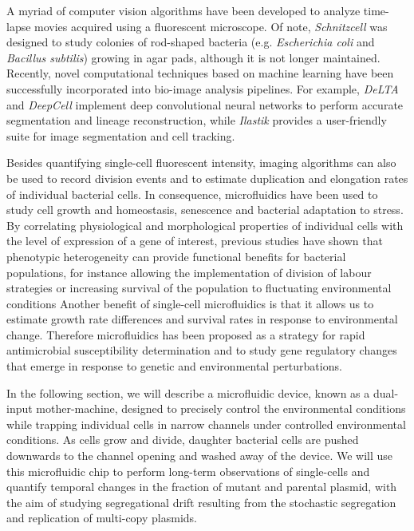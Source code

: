 \documentclass[fleqn,12pt]{wlscirep}
\begin{document}
A myriad of computer vision algorithms have been developed to analyze time-lapse movies acquired using a fluorescent microscope\cite{Young2012,vanValen2016,Berg2019,balomenos2017image,arnoldini2014bistable,sachs2016image,lugagne2019delta,kamentsky2011improved}.  Of note, {\em Schnitzcell}\cite{Young2012} was designed to study colonies of rod-shaped bacteria (e.g. {\em Escherichia coli} and {\em Bacillus subtilis}) growing in agar pads, although it is not longer maintained.  Recently, novel computational techniques based on machine learning have been successfully incorporated into bio-image analysis pipelines. For example, {\em DeLTA}\cite{lugagne2019delta} and {\em DeepCell}\cite{vanValen2016} implement deep convolutional neural networks to perform accurate segmentation and lineage reconstruction, while {\em Ilastik}\cite{berg2019ilastik} provides a user-friendly suite for image segmentation and cell tracking. 

Besides quantifying single-cell fluorescent intensity, imaging algorithms can also be used to record division events and to estimate duplication and elongation rates of individual bacterial cells.  In consequence, microfluidics have been used to study cell growth and homeostasis\cite{wallden2016synchronization}, senescence\cite{ackermann2003senescence,lindner2008asymmetric} and bacterial adaptation to stress\cite{lapinska2019bacterial,mathis2016response,patange2018escherichia}. By correlating physiological and morphological properties of individual cells with the level of expression of a gene of interest, previous studies have shown that phenotypic heterogeneity can provide functional benefits for bacterial populations, for instance allowing the implementation of division of labour strategies or increasing survival of the population to fluctuating environmental conditions\cite{Ackermann2015}
Another benefit of single-cell microfluidics is that it allows us to estimate growth rate differences and survival rates in response to environmental change.  Therefore microfluidics has been proposed as a strategy for rapid antimicrobial susceptibility determination \cite{Baltekin2017,Aroonnual2017} and to study gene regulatory changes that emerge in response to genetic and environmental perturbations\cite{rochman2016grow,chait2017shaping}.   

In the following section, we will describe a microfluidic device, known as a dual-input mother-machine, designed to precisely control the environmental conditions while trapping individual cells in narrow channels under controlled environmental conditions. As cells grow and divide, daughter bacterial cells are pushed downwards to the channel opening and washed away of the device. We will use this microfluidic chip to perform long-term observations of single-cells and quantify temporal changes in the fraction of mutant and parental plasmid, with the aim of studying segregational drift resulting from the stochastic segregation and replication of multi-copy plasmids.
\end{document}

